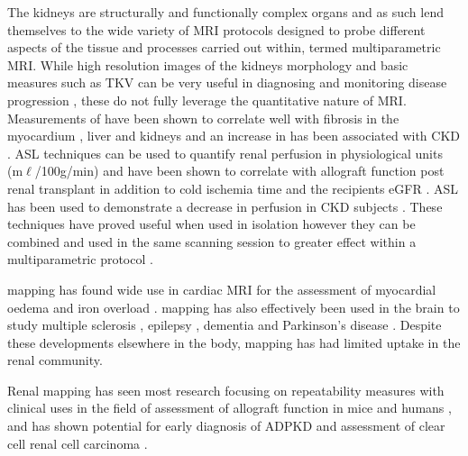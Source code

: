 The kidneys are structurally and functionally complex organs and as such lend themselves to the wide variety of \ac{MRI} protocols designed to probe different aspects of the tissue and processes carried out within, termed multiparametric \ac{MRI}. While high resolution images of the kidneys morphology and basic measures such as \ac{TKV} can be very useful in diagnosing and monitoring disease progression \cite{buchanan_quantitative_2019, chapman_kidney_2012, gong_relationship_2012}, these do not fully leverage the quantitative nature of \ac{MRI}. Measurements of \tone have been shown to correlate well with fibrosis in the myocardium \cite{bull_human_2013, ferreira_t1_2013}, liver \cite{hoad_study_2015, luetkens_quantification_2018} and kidneys \cite{friedli_new_2016} and an increase in \tone has been associated with \ac{CKD} \cite{gillis_non-contrast_2016, cox_multiparametric_2017, buchanan_quantitative_2019}. \ac{ASL} techniques can be used to quantify renal perfusion in physiological units (m$\ell$/100g/min) and have been shown to correlate with allograft function post renal transplant in addition to cold ischemia time and the recipients \ac{eGFR} \cite{hueper_functional_2015, artz_arterial_2011, ren_evaluation_2016, niles_longitudinal_2016}. \ac{ASL} has been used to demonstrate a decrease in perfusion in \ac{CKD} subjects \cite{gillis_non-contrast_2016, rossi_histogram_2012, tan_renal_2014}. These techniques have proved useful when used in isolation however they can be combined and used in the same scanning session to greater effect within a multiparametric protocol \cite{buchanan_quantitative_2019, cox_multiparametric_2017, eckerbom_multiparametric_2019, schley_multiparametric_2018, hueper_kidney_2016}.

\ttwo mapping has found wide use in cardiac \ac{MRI} for the assessment of myocardial oedema \cite{gouya_rapidly_2008, giri_t2_2009, nasenstein_cardiac_2014} and iron overload \cite{guo_myocardial_2009, krittayaphong_detection_2017}. \ttwo mapping has also effectively been used in the brain to study multiple sclerosis \cite{neema_t1-_2007}, epilepsy \cite{rugg-gunn_whole-brain_2005}, dementia \cite{knight_quantitative_2016} and Parkinson’s disease \cite{vymazal_t1_1999}. Despite these developments elsewhere in the body, \ttwo mapping has had limited uptake in the renal community.

Renal \ttwo mapping has seen most research focusing on repeatability measures \cite{de_bazelaire_mr_2004, zhang_reproducibility_2011, li_measuring_2015, de_boer_multiparametric_2020} with clinical uses in the field of assessment of allograft function in mice \cite{hueper_kidney_2016} and humans \cite{mathys_t2_2011, adams_multiparametric_2020}, and has shown potential for early diagnosis of \ac{ADPKD} \cite{franke_magnetic_2017} and assessment of clear cell renal cell carcinoma \cite{adams_use_2019}.

